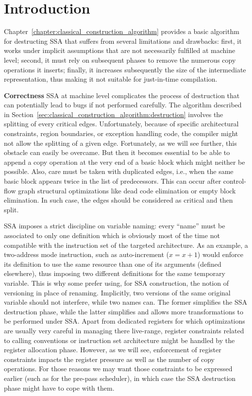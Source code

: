 \section{Introduction}
Chapter~\ref{chapter:classical_construction_algorithm} provides a basic algorithm for destructing SSA that suffers from several limitations and drawbacks: first, it works under implicit assumptions that are not necessarily fulfilled at machine level; second, it must rely on subsequent phases to remove the numerous copy operations it inserts; finally, it increases subsequently the size of the intermediate representation, thus making it not suitable for just-in-time compilation.   

{\bf Correctness}
SSA at machine level complicates the process of destruction that can potentially lead to bugs if not performed carefully. The algorithm described in Section~\ref{sec:classical_construction_algorithm:destruction} involves the splitting of every critical edges. Unfortunately, because of specific architectural constraints, region boundaries, or exception handling code, the compiler might not allow the splitting of a given edge. Fortunately, as we will see further, this obstacle can easily be overcame. But then it becomes essential to be able to append a copy operation at the very end of a basic block which might neither be possible. Also, care must be taken with duplicated edges, i.e., when the same basic block appears twice in the list of predecessors.
This can occur after control-flow graph structural optimizations like
dead code elimination or empty block elimination.
In such case, the edges should be considered as critical and then split.

SSA imposes a strict discipline on variable naming: every ``name'' must be associated to only one definition which is obviously most of the time not compatible with the instruction set of the targeted architecture. As an example, a two-address mode instruction, such as auto-increment ($x=x+1$) would enforce its definition to use the same resource than one of its arguments (defined elsewhere), thus imposing two different definitions for the same temporary variable. This is why some prefer using, for SSA construction, the notion of versioning in place of renaming. Implicitly, two versions of the same original variable should not interfere, while two names can. The former simplifies the SSA destruction phase, while the latter simplifies and allows more transformations to be performed under SSA. Apart from dedicated registers for which optimizations are usually very careful in managing there live-range, register constraints related to calling conventions or instruction set architecture might be handled by the register allocation phase. However, as we will see, enforcement of register constraints impacts the register pressure as well as the number of copy operations. For those reasons we may want those constraints to be expressed earlier (such as for the pre-pass scheduler), in which case the SSA destruction phase might have to cope with them.

